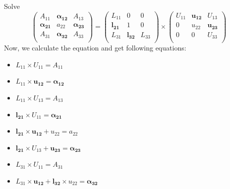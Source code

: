 \documentclass[9pt]{beamer}
\begin{document}
	\begin{frame}{Solve}
		\[
		\left( \begin{array}{ccc} A_{11} & \pmb{\alpha_{12}}  & A_{13}\\ \pmb{\alpha_{21}} & a_{22}  & \pmb{\alpha_{23}}\\  A_{31} & \pmb{\alpha_{32}}  & A_{33}\\ \end{array} \right)  = \left( \begin{array}{ccc} L_{11} & 0  & 0\\ \pmb{l_{21}} & 1  & 0\\  L_{31} & \pmb{l_{32}}  & L_{33}\\ \end{array} \right) \times \left( \begin{array}{ccc} U_{11} & \pmb{u_{12}}  & U_{13}\\ 0 & u_{22}  & \pmb{u_{23}}\\  0 & 0  & U_{33}\\ \end{array} \right)
		\]
		Now, we calculate the equation and get following equations:
		\begin{itemize}
			\item $L_{11}\times U_{11} = A_{11}$
			\item $L_{11}\times \pmb{u_{12}} = \pmb{\alpha_{12}}$
			\item $L_{11}\times U_{13} = A_{13}$
			\item $\pmb{l_{21}} \times U_{11} = \pmb{\alpha_{21}}$
			\item $\pmb{l_{21}} \times  \pmb{u_{12}} + u_{22} = a_{22}$
			\item $\pmb{l_{21}} \times U_{13} + \pmb{u_{23}} = \pmb{\alpha_{23}}$
			\item $L_{31}\times U_{11} = A_{31}$
			\item $L_{31}\times \pmb{u_{12}} +\pmb{l_{32}}\times u_{22} = \pmb{\alpha_{32}}$
		\end{itemize}
	\end{frame}
\end{document}
